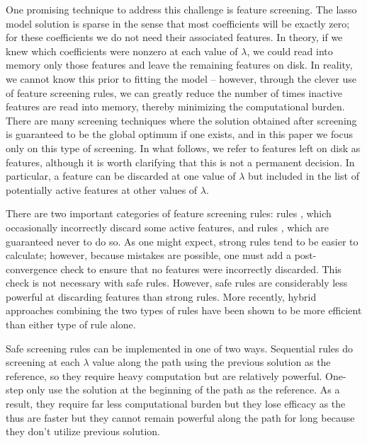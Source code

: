 One promising technique to address this challenge is feature screening. The lasso model solution is sparse in the sense that most coefficients will be exactly zero; for these  coefficients we do not need their associated features.  In theory, if we knew which coefficients were nonzero at each value of $\lambda$, we could read into memory only those features and leave the remaining features on disk. In reality, we cannot know this prior to fitting the model -- however, through the clever use of feature screening rules, we can greatly reduce the number of times inactive features are read into memory, thereby minimizing the computational burden. There are many screening techniques where the solution obtained after screening is guaranteed to be the global optimum if one exists, and in this paper we focus only on this type of screening. In what follows, we refer to features left on disk as  features, although it is worth clarifying that this is not a permanent decision.  In particular, a feature can be discarded at one value of $\lambda$ but included in the list of potentially active features at other values of $\lambda$.

There are two important categories of feature screening rules:  rules \citep{Tibshirani2012, qian2019fast}, which occasionally incorrectly discard some active features, and  rules \citep{ghaoui2010safe,wang2013lasso,xiang2012fast, xiang2011learning}, which are guaranteed never to do so.  As one might expect, strong rules tend to be easier to calculate; however, because mistakes are possible, one must add a post-convergence check to ensure that no features were incorrectly discarded. This check is not necessary with safe rules. However, safe rules are considerably less powerful at discarding features than strong rules. More recently, hybrid approaches \citep{Zeng2021} combining the two types of rules have been shown to be more efficient than either type of rule alone.

Safe screening rules can be implemented in one of two ways. Sequential rules do screening at each $\lambda$ value along the path using the previous solution as the reference, so they require heavy computation but are relatively powerful. One-step only use the solution at the beginning of the path as the reference. As a result, they require far less computational burden but they lose efficacy as the thus are faster but they cannot remain powerful along the path for long because they don't utilize previous solution.

